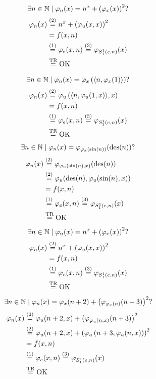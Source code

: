 $$ \exists n \in \mathbb{N} \mid \varphi_n (x) = n^x + \left(\varphi_x (x)\right)^2 ? $$
\begin{align*}
	\varphi_n (x) & \stackrel{(2)}{=} n^x + \left(\varphi_u (x,x)\right)^2 \\
	& = f(x,n) \\
	& \stackrel{(1)}{=} \varphi_e (x,n) \stackrel{(3)}{=} \varphi_{S^1_1 (e,n)} (x) \\
	& \stackrel{\text{TR}}{=} \text{OK}
\end{align*}

$$ \exists n \in \mathbb{N} \mid \varphi_n (x) = \varphi_x \left(\langle n, \varphi_x (1) \rangle \right) ?$$
\begin{align*}
	\varphi_n (x) & \stackrel{(2)}{=} \varphi_u \left(\langle n, \varphi_u (1, x) \rangle, x\right) \\
	& = f(x,n) \\
	& \stackrel{(1)}{=} \varphi_e (x,n) \stackrel{(3)}{=} \varphi_{S_1^1 (e,n)} (x) \\
	& \stackrel{\text{TR}}{=} \text{OK}
\end{align*}
$$ \exists n \in \mathbb{N} \mid \varphi_n (x) = \varphi_{\varphi_x (\sin (n))} (\operatorname{des} (n)) ? $$
\begin{align*}
	\varphi_n (x) & \stackrel{(2)}{=} \varphi_{\varphi_u (\sin (n), x)} (\operatorname{des} (n)) \\
	& \stackrel{(2)}{=} \varphi_u (\operatorname{des} (n), \varphi_u (\sin (n), x)) \\
	& = f(x,n) \\
	& \stackrel{(1)}{=} \varphi_e (x,n) \stackrel{(3)}{=} \varphi_{S_1^1 (e,n)} (x) \\
	& \stackrel{\text{TR}}{=} \text{OK}
\end{align*}
$$ \exists n \in \mathbb{N} \mid \varphi_n (x) = n^x + \left(\varphi_x (x)\right)^2 ?$$
\begin{align*}
	\varphi_n (x) & \stackrel{(2)}{=} n^x + \left(\varphi_u (x,x)\right)^2 \\
	& = f(x,n) \\
	& \stackrel{(1)}{=} \varphi_e (x,n) \stackrel{(3)}{=} \varphi_{S_1^1 (e,n)} (x) \\
	& \stackrel{\text{TR}}{=} \text{OK} \\
\end{align*}
$$ \exists n \in \mathbb{N} \mid \varphi_n (x) = \varphi_x (n + 2) + \left(\varphi_{\varphi_x (n)} (n+3)\right)^2 ? $$
\begin{align*}
	\varphi_n (x) & \stackrel{(2)}{=} \varphi_u (n + 2, x) + \left(\varphi_{\varphi_u (n, x)} (n + 3)\right)^2 \\
	& \stackrel{(2)}{=} \varphi_u (n+2, x) + \left(\varphi_u \left(n + 3, \varphi_u (n,x)\right)\right)^2  \\
	& = f(x,n) \\
	& \stackrel{(1)}{=} \varphi_e (x,n) \stackrel{(3)}{=} \varphi_{S_1^1 (e,n)} (x) \\
	& \stackrel{\text{TR}}{=} \text{OK}
\end{align*}


